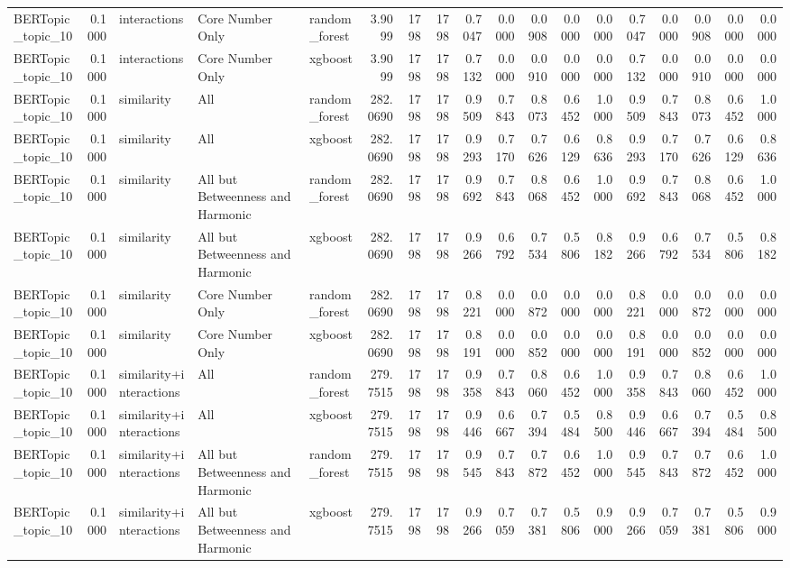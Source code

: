 \begin{tabular}{lrlllrrrrrrrrrrrrr}
BERTopic_topic_10 & 0.1000 & interactions & Core Number Only & random_forest & 3.9099 & 1798 & 1798 & 0.7047 & 0.0000 & 0.0908 & 0.0000 & 0.0000 & 0.7047 & 0.0000 & 0.0908 & 0.0000 & 0.0000 \\
BERTopic_topic_10 & 0.1000 & interactions & Core Number Only & xgboost & 3.9099 & 1798 & 1798 & 0.7132 & 0.0000 & 0.0910 & 0.0000 & 0.0000 & 0.7132 & 0.0000 & 0.0910 & 0.0000 & 0.0000 \\
BERTopic_topic_10 & 0.1000 & similarity & All & random_forest & 282.0690 & 1798 & 1798 & 0.9509 & 0.7843 & 0.8073 & 0.6452 & 1.0000 & 0.9509 & 0.7843 & 0.8073 & 0.6452 & 1.0000 \\
BERTopic_topic_10 & 0.1000 & similarity & All & xgboost & 282.0690 & 1798 & 1798 & 0.9293 & 0.7170 & 0.7626 & 0.6129 & 0.8636 & 0.9293 & 0.7170 & 0.7626 & 0.6129 & 0.8636 \\
BERTopic_topic_10 & 0.1000 & similarity & All but Betweenness and Harmonic & random_forest & 282.0690 & 1798 & 1798 & 0.9692 & 0.7843 & 0.8068 & 0.6452 & 1.0000 & 0.9692 & 0.7843 & 0.8068 & 0.6452 & 1.0000 \\
BERTopic_topic_10 & 0.1000 & similarity & All but Betweenness and Harmonic & xgboost & 282.0690 & 1798 & 1798 & 0.9266 & 0.6792 & 0.7534 & 0.5806 & 0.8182 & 0.9266 & 0.6792 & 0.7534 & 0.5806 & 0.8182 \\
BERTopic_topic_10 & 0.1000 & similarity & Core Number Only & random_forest & 282.0690 & 1798 & 1798 & 0.8221 & 0.0000 & 0.0872 & 0.0000 & 0.0000 & 0.8221 & 0.0000 & 0.0872 & 0.0000 & 0.0000 \\
BERTopic_topic_10 & 0.1000 & similarity & Core Number Only & xgboost & 282.0690 & 1798 & 1798 & 0.8191 & 0.0000 & 0.0852 & 0.0000 & 0.0000 & 0.8191 & 0.0000 & 0.0852 & 0.0000 & 0.0000 \\
BERTopic_topic_10 & 0.1000 & similarity+interactions & All & random_forest & 279.7515 & 1798 & 1798 & 0.9358 & 0.7843 & 0.8060 & 0.6452 & 1.0000 & 0.9358 & 0.7843 & 0.8060 & 0.6452 & 1.0000 \\
BERTopic_topic_10 & 0.1000 & similarity+interactions & All & xgboost & 279.7515 & 1798 & 1798 & 0.9446 & 0.6667 & 0.7394 & 0.5484 & 0.8500 & 0.9446 & 0.6667 & 0.7394 & 0.5484 & 0.8500 \\
BERTopic_topic_10 & 0.1000 & similarity+interactions & All but Betweenness and Harmonic & random_forest & 279.7515 & 1798 & 1798 & 0.9545 & 0.7843 & 0.7872 & 0.6452 & 1.0000 & 0.9545 & 0.7843 & 0.7872 & 0.6452 & 1.0000 \\
BERTopic_topic_10 & 0.1000 & similarity+interactions & All but Betweenness and Harmonic & xgboost & 279.7515 & 1798 & 1798 & 0.9266 & 0.7059 & 0.7381 & 0.5806 & 0.9000 & 0.9266 & 0.7059 & 0.7381 & 0.5806 & 0.9000 \\

\end{tabular}
